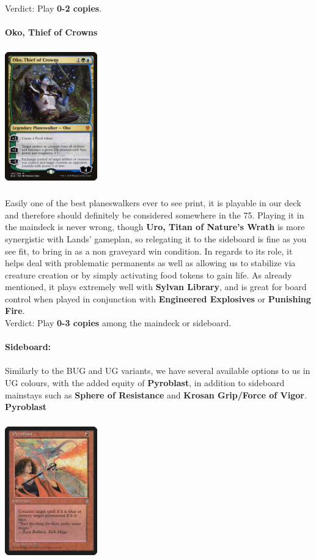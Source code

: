 \documentclass{report}
\begin{document}
Verdict:  Play \textbf{0-2 copies}.\\\\
\textbf{Oko, Thief of Crowns}
\begin{center}
\includegraphics [width = 4cm, height = 6cm] {oko-thief-of-crowns}
\end{center}
Easily one of the best planeswalkers ever to see print, it is playable in our deck and therefore should definitely be considered somewhere in the 75. Playing it in the maindeck is never wrong, though \textbf{Uro, Titan of Nature's Wrath} is more synergistic with Lands' gameplan, so relegating it to the sideboard is fine as you see fit, to bring in as a non graveyard win condition. In regards to its role, it helps deal with problematic permanents as well as allowing us to stabilize via creature creation or by simply activating food tokens to gain life. As already mentioned, it plays extremely well with \textbf{Sylvan Library}, and is great for board control when played in conjunction with \textbf{Engineered Explosives} or \textbf{Punishing Fire}.\\
Verdict:  Play \textbf{0-3 copies} among the maindeck or sideboard.\\\\
\textbf{Sideboard:\\\\}
Similarly to the BUG and UG variants, we have several available options to us in UG colours, with the added equity of \textbf{Pyroblast}, in addition to sideboard mainstays such as \textbf{Sphere of Resistance} and \textbf{Krosan Grip/Force of Vigor}.
\textbf{Pyroblast}
\begin{center}
\includegraphics [width = 4cm, height = 6cm] {pyroblast}
\end{center}
\end{document}
